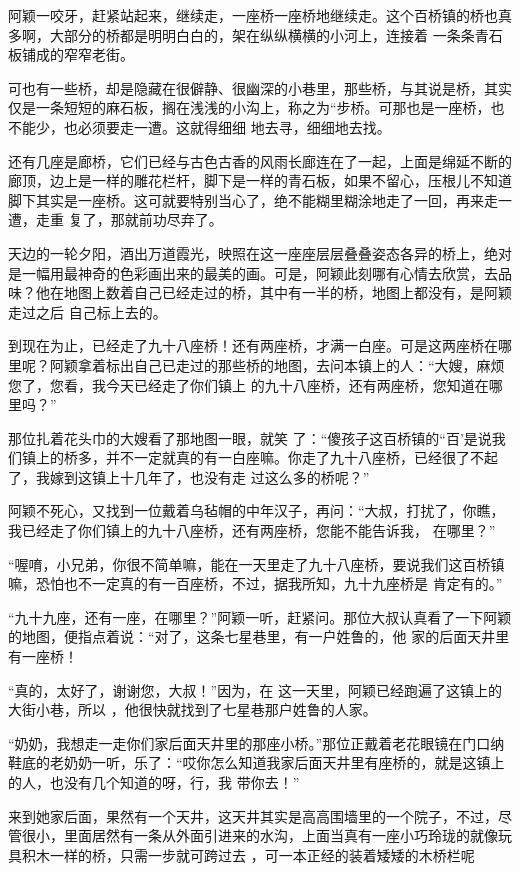 \documentclass{article}
\begin{document}
阿颖一咬牙，赶紧站起来，继续走，一座桥一座桥地继续走。这个百桥镇的桥也真多啊，大部分的桥都是明明白白的，架在纵纵横横的小河上，连接着
一条条青石板铺成的窄窄老街。 

可也有一些桥，却是隐藏在很僻静、很幽深的小巷里，那些桥，与其说是桥，其实仅是一条短短的麻石板，搁在浅浅的小沟上，称之为“步桥。可那也是一座桥，也不能少，也必须要走一遭。这就得细细
地去寻，细细地去找。 

\newpage

还有几座是廊桥，它们已经与古色古香的风雨长廊连在了一起，上面是绵延不断的廊顶，边上是一样的雕花栏杆，脚下是一样的青石板，如果不留心，压根儿不知道脚下其实是一座桥。这可就要特别当心了，绝不能糊里糊涂地走了一回，再来走一遭，走重
复了，那就前功尽弃了。 

天边的一轮夕阳，酒出万道霞光，映照在这一座座层层叠叠姿态各异的桥上，绝对是一幅用最神奇的色彩画出来的最美的画。可是，阿颖此刻哪有心情去欣赏，去品味？他在地图上数着自己已经走过的桥，其中有一半的桥，地图上都没有，是阿颖走过之后
自己标上去的。 

到现在为止，已经走了九十八座桥！还有两座桥，才满一白座。可是这两座桥在哪里呢？阿颖拿着标出自己已走过的那些桥的地图，去问本镇上的人：“大嫂，麻烦您了，您看，我今天已经走了你们镇上
的九十八座桥，还有两座桥，您知道在哪里吗？” 

那位扎着花头巾的大嫂看了那地图一眼，就笑
\newpage
了：“傻孩子这百桥镇的“百’是说我们镇上的桥多，并不一定就真的有一白座嘛。你走了九十八座桥，已经很了不起了，我嫁到这镇上十几年了，也没有走
过这么多的桥呢？” 

阿颖不死心，又找到一位戴着乌毡帽的中年汉子，再问：“大叔，打扰了，你瞧，我已经走了你们镇上的九十八座桥，还有两座桥，您能不能告诉我，
在哪里？” 

“喔唷，小兄弟，你很不简单嘛，能在一天里走了九十八座桥，要说我们这百桥镇嘛，恐怕也不一定真的有一百座桥，不过，据我所知，九十九座桥是
肯定有的。” 

“九十九座，还有一座，在哪里？”阿颖一听，赶紧问。那位大叔认真看了一下阿颖的地图，便指点着说：“对了，这条七星巷里，有一户姓鲁的，他
家的后面天井里有一座桥！ 

“真的，太好了，谢谢您，大叔！”因为，在
\newpage
这一天里，阿颖已经跑遍了这镇上的大街小巷，所以
，他很快就找到了七星巷那户姓鲁的人家。 

“奶奶，我想走一走你们家后面天井里的那座小桥。”那位正戴着老花眼镜在门口纳鞋底的老奶奶一听，乐了：“哎你怎么知道我家后面天井里有座桥的，就是这镇上的人，也没有几个知道的呀，行，我
带你去！” 

来到她家后面，果然有一个天井，这天井其实是高高围墙里的一个院子，不过，尽管很小，里面居然有一条从外面引进来的水沟，上面当真有一座小巧玲珑的就像玩具积木一样的桥，只需一步就可跨过去
，可一本正经的装着矮矮的木桥栏呢 
\end{document}
